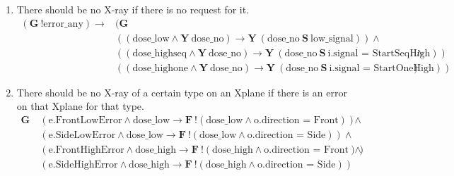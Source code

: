 \documentclass[a4paper,10pt]{article}
\newcommand{\LTLG}{\mathbf{G~}}
\newcommand{\LTLF}{\mathbf{F~}}
\newcommand{\LTLY}{\mathbf{Y~}}
\newcommand{\LTLS}{\mathbf{~S~}}
\newcommand{\imply}{\rightarrow}
\newcommand{\doselow}{\textrm{dose\_low}}
\newcommand{\doseno}{\textrm{dose\_no}}
\newcommand{\dosehigh}{\textrm{dose\_high}}
\newcommand{\dosehighseq}{\textrm{dose\_highseq}}
\newcommand{\dosehighone}{\textrm{dose\_highone}}
\newcommand{\lowsignal}{\textrm{low\_signal}}
\newcommand{\errorany}{\textrm{error\_any}}
\begin{document}
	\begin{enumerate}
		\item There should be no X-ray if there is no request for it.
			\begin{align*}
				(\LTLG !\errorany) \imply & (\LTLG \\
					& ((\doselow \land \LTLY \doseno) \imply \LTLY (\doseno \LTLS \lowsignal)) \land \\
					& ((\dosehighseq \land \LTLY \doseno) \imply \LTLY (\doseno \LTLS \textrm{i.signal = StartSeqHigh})) \land \\
					& ((\dosehighone \land \LTLY \doseno) \imply \LTLY (\doseno \LTLS \textrm{i.signal = StartOneHigh})))
			\end{align*}

		\item There should be no X-ray of a certain type on an Xplane if there is an error on that Xplane for that type.
			\begin{align*}
				\LTLG & (\textrm{e.FrontLowError} \land \doselow \imply \LTLF !(\doselow \land \textrm{o.direction = Front})) \land \\
					& (\textrm{e.SideLowError} \land \doselow \imply \LTLF !(\doselow \land \textrm{o.direction = Side})) \land \\
					& (\textrm{e.FrontHighError} \land \dosehigh \imply \LTLF !(\dosehigh \land \textrm{o.direction = Front})) \land \\
					& (\textrm{e.SideHighError} \land \dosehigh \imply \LTLF !(\dosehigh \land \textrm{o.direction = Side}))
			\end{align*}


\end{enumerate}
\end{document}
